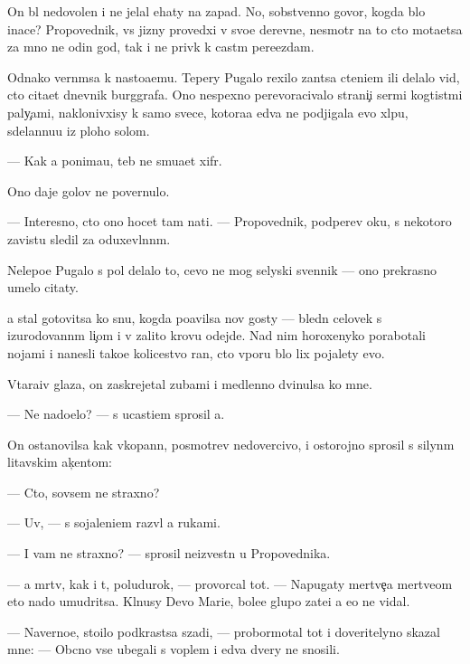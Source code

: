 \documentclass[10pt]{book}
\begin{document}
On b{\yi}l nedovolen i ne jelal {\y}ehaty na zapad. No, sobstvenno go\-vo\-r{\ia}, kogda b{\yi}lo inace? Pro\-po\-ved\-nik, vs{\io} jizny provedxi{\y} v svo{\y}e{\y} derevne, ne\-smo\-tr{\ia} na to cto mota{\y}etsa za mno{\y} ne odin god, tak i ne priv{\yi}k k cast{\yi}m pere{\y}ezdam.

Odnako vern{\e}msa k nasto{\y}a{\x}emu. Tepery Pugalo rexilo zan{\ia}tsa cteni{\y}em ili delalo vid, cto cita{\y}et dnevnik burggrafa. Ono nespexno perevoracivalo strani{\c}i ser{\yi}mi kogtist{\yi}mi paly{\c}ami, naklonivxisy k samo{\y} svece, kotora{\y}a {\y}edva ne podjigala {\y}evo xl{\ia}pu, sdelannu{\y}u iz ploho{\y} solom{\yi}.

— Kak {\y}a ponima{\y}u, teb{\ia} ne smu{\x}a{\y}et xifr.

Ono daje golov{\yi} ne povernulo.

— Interesno, cto ono hocet tam na{\y}ti. — Pro\-po\-ved\-nik, podperev {\x}oku, s nekotoro{\y} zavist{\y}u sledil za oduxevl{\e}nn{\yi}m.

Nelepo{\y}e Pugalo s pol{\ia} delalo to, cevo ne mog selyski{\y} sv{\ia}{\x}ennik — ono pre\-kras\-no umelo citaty.

{\Y}a stal gotovitsa ko snu, kogda po{\y}avilsa nov{\yi}{\y} gosty — bledn{\yi}{\y} celovek s izu\-ro\-do\-van\-n{\yi}m li{\c}om i v zalito{\y} krov{\y}u odejde. Nad nim horoxenyko porabotali nojami i nanesli tako{\y}e kolicestvo ran, cto vporu b{\yi}lo lix pojalety {\y}evo.

V{\yi}tara{\x}iv glaza, on zaskrejetal zubami i medlenno dvinulsa ko mne.

— Ne nado{\y}elo? — s ucasti{\y}em sprosil {\y}a.

On ostanovilsa kak vkopann{\yi}{\y}, posmotrev nedovercivo, i ostorojno sprosil s sily\-n{\yi}m litavskim ak{\c}entom:

— Cto, sovsem ne straxno?

— Uv{\yi}, — s sojaleni{\y}em razv{\e}l {\y}a rukami.

— I vam ne straxno? — sprosil neizvestn{\yi}{\y} u Pro\-po\-ved\-nika.

— {\Y}a m{\e}rtv, kak i t{\yi}, poludurok, — provorcal tot. — Napugaty mertve{\c}a mer\-tve\-{\c}om eto nado umudritsa. Kl{\ia}nusy Devo{\y} Mari{\y}e{\y}, bole{\y}e glupo{\y} zate{\y}i {\y}a {\y}e{\x}o ne vidal.

— Naverno{\y}e, stoilo podkrastsa szadi, — probormotal tot i doveritelyno skazal mne: — Ob{\yi}cno vse ubegali s voplem i {\y}edva dvery ne snosili.
\end{document}
